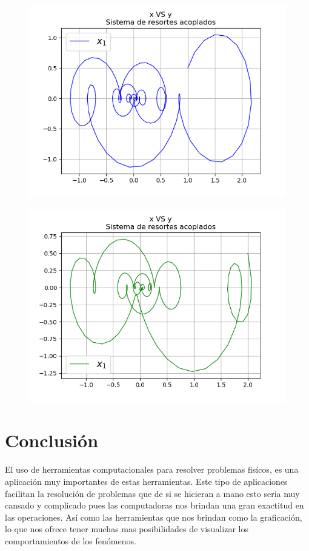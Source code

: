 \documentclass{article}
\begin{document}
\begin{figure}[h]
\centering
\includegraphics[scale=0.5]{r14.png}
\label{figure: Resortes acoplados }
\end{figure}

\begin{figure}[h]
\centering
\includegraphics[scale=0.5]{r15.png}
\label{figure: Resortes acoplados }
\end{figure}





\section{Conclusión}
El uso de herramientas computacionales para resolver problemas fisícos, es una aplicación muy importantes de estas herramientas.
Este tipo de aplicaciones facilitan la resolución de problemas que de si se hicieran a mano esto seria muy cansado y complicado pues las computadoras nos brindan una gran exactitud en las operaciones. Así como las herramientas que nos brindan como la graficación, lo que nos ofrece tener muchas mas posibilidades de visualizar los comportamientos de los fenómenos.
\end{document}
